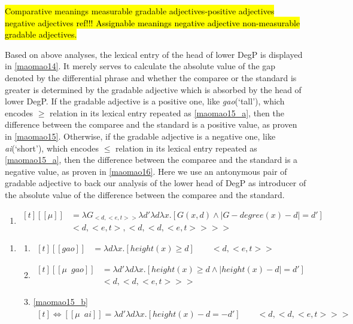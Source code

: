 \documentclass{ctexart}
\begin{document}
\hl{Comparative meanings measurable gradable adjectives-positive adjectives negative adjectives ref!!! Assignable meanings negative adjective non-measurable gradable adjectives.}

Based on above analyses, the lexical entry of the head of lower DegP is displayed in \ref{maomao14}.  It merely serves to calculate the absolute value of the gap denoted by the differential phrase and whether the comparee or the standard is greater is determined by the gradable adjective which is absorbed by the head of lower DegP. If the gradable adjective is a positive one, like \textit{gao}(`tall'), which encodes $\geq$ relation in its lexical entry repeated as \ref{maomao15_a}, then the difference between the comparee and the standard is a positive value, as proven in \ref{maomao15}. Otherwise, if the gradable adjective is a negative one, like \textit{ai}(`short'), which encodes $\leq$ relation in its lexical entry repeated as \ref{maomao15_a}, then the difference between the comparee and the standard is a negative value, as proven in \ref{maomao16}. Here we use an antonymous pair of gradable adjective to back our analysis of the lower head of DegP as introducer  of the absolute value of the difference between the comparee and the standard.

\begin{enumerate}
    \item \label{maomao14}
    $\begin{aligned}[t]
        [\![\mu]\!] &= \lambda G_{<d,<e,t>>} \lambda d' \lambda d \lambda x.[G(x,d) \land | G-degree(x) - d | = d'] \\
        & <d,<e,t>,<d,<d,<e,t>>>>
    \end{aligned}$
\end{enumerate}


\begin{enumerate}
    \item \label{maomao15}
    \begin{enumerate}
        \item \label{maomao15_a}
        $\begin{aligned}[t]
            [\![gao]\!] &= \lambda d \lambda x.[height(x) \geq d] \qquad <d,<e,t>>
        \end{aligned}$

        \item \label{maomao15_b}
        $\begin{aligned}[t]
            [\![\mu \enspace gao]\!] &= \lambda d' \lambda d \lambda x.[height(x) \geq d \land |height(x) - d|=d'] \\
            & <d,<d,<e,t>>>
        \end{aligned}$
        
        \item \label{maomao15_c}
        \ref{maomao15_b}
        $\begin{aligned}[t]
            \Leftrightarrow [\![\mu \enspace ai]\!] = \lambda d' \lambda d \lambda x.[height(x)-d=-d'] \qquad <d,<d,<e,t>>>
        \end{aligned}$
    \end{enumerate}
\end{enumerate}
\end{document}
